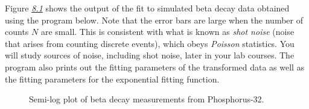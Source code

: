 \documentclass[letterpaper,10pt,english]{sphinxmanual}
\begin{document}
Figure {\hyperref[chap8/chap8_fitting:fig-betadecay]{\emph{8.1}}} shows the output of the fit to simulated beta decay data obtained using the program below.  Note that the error bars are large when the number of counts \(N\) are small.  This is consistent with what is known as \emph{shot noise} (noise that arises from counting discrete events), which obeys \emph{Poisson} statistics.  You will study sources of noise, including shot noise, later in your lab courses.  The program also prints out the fitting parameters of the transformed data as well as the fitting parameters for the exponential fitting function.
\begin{figure}[htbp]
\centering
\capstart

\caption{Semi-log plot of beta decay measurements from Phosphorus-32.}\label{chap8/chap8_fitting:fig-betadecay}\end{figure}
\end{document}
